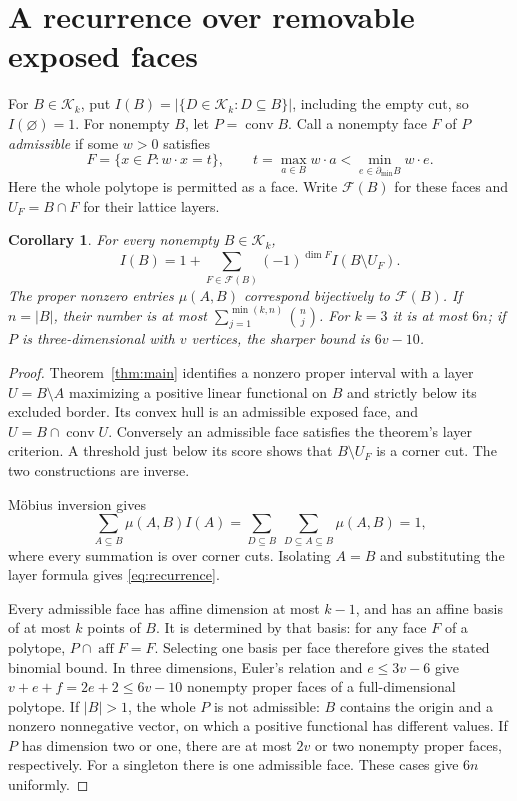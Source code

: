 \documentclass[11pt]{article}
\newtheorem{corollary}[theorem]{Corollary}
\theoremstyle{remark}
\newcommand{\K}{\mathcal K}
\newcommand{\bd}{\partial_{\min}}
\begin{document}
\section{A recurrence over removable exposed faces}

For $B\in\K_k$, put $I(B)=|\{D\in\K_k:D\subseteq B\}|$, including
the empty cut, so $I(\varnothing)=1$. For nonempty $B$, let $P=\operatorname{conv}B$.
Call a nonempty face $F$ of $P$ \emph{admissible} if some $w>0$ satisfies
\begin{equation}\label{eq:admissible}
 F=\{x\in P:w\cdot x=t\},\qquad
 t=\max_{a\in B}w\cdot a<\min_{e\in\bd B}w\cdot e.
\end{equation}
Here the whole polytope is permitted as a face. Write $\mathcal F(B)$ for
these faces and $U_F=B\cap F$ for their lattice layers.

\begin{corollary}\label{cor:recurrence}
For every nonempty $B\in\K_k$,
\begin{equation}\label{eq:recurrence}
 I(B)=1+\sum_{F\in\mathcal F(B)}(-1)^{\dim F}I(B\setminus U_F).
\end{equation}
The proper nonzero entries $\mu(A,B)$ correspond bijectively to
$\mathcal F(B)$. If $n=|B|$, their number is at most
$\sum_{j=1}^{\min(k,n)}\binom{n}{j}$. For $k=3$ it is at most $6n$;
if $P$ is three-dimensional with $v$ vertices, the sharper bound is $6v-10$.
\end{corollary}
\begin{proof}
Theorem~\ref{thm:main} identifies a nonzero proper interval with a layer
$U=B\setminus A$ maximizing a positive linear functional on $B$ and strictly
below its excluded border. Its convex hull is an admissible exposed face,
and $U=B\cap\operatorname{conv}U$. Conversely an admissible face satisfies
the theorem's layer criterion. A threshold just below its score shows that
$B\setminus U_F$ is a corner cut. The two constructions are inverse.

M\"obius inversion gives
\[
 \sum_{A\subseteq B}\mu(A,B)I(A)
 =\sum_{D\subseteq B}\ \sum_{D\subseteq A\subseteq B}\mu(A,B)=1,
\]
where every summation is over corner cuts. Isolating $A=B$ and substituting
the layer formula gives \eqref{eq:recurrence}.

Every admissible face has affine dimension at most $k-1$, and has an affine
basis of at most $k$ points of $B$. It is determined by that basis: for any
face $F$ of a polytope, $P\cap\operatorname{aff}F=F$. Selecting one basis
per face therefore gives the stated binomial bound. In three dimensions,
Euler's relation and $e\leq3v-6$ give $v+e+f=2e+2\leq6v-10$ nonempty
proper faces of a full-dimensional polytope. If $|B|>1$, the whole $P$
is not admissible: $B$ contains the origin and a nonzero nonnegative vector,
on which a positive functional has different values. If $P$ has dimension
two or one, there are at most $2v$ or two nonempty proper faces, respectively.
For a singleton there is one admissible face. These cases give $6n$ uniformly.
\end{proof}
\end{document}
